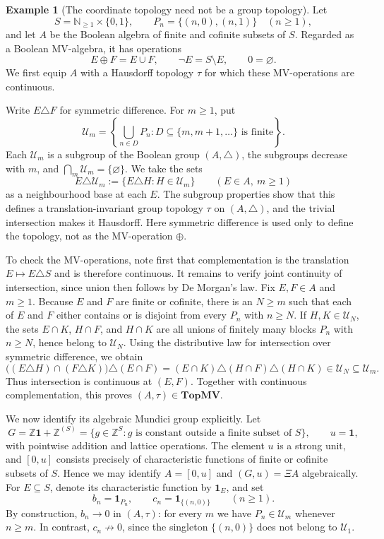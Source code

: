 \documentclass[preprint,3p]{elsarticle}
\theoremstyle{plain}
\theoremstyle{definition}
\newtheorem{exmp}[thm]{Example}
\newcommand{\TopMV}{\mathbf{TopMV}}
\numberwithin{equation}{section}
\begin{document}
\begin{exmp}[The coordinate topology need not be a group topology]
\label{exmp-kappa-not-group}
Let
\[
 S=\mathbb N_{\geq1}\times\{0,1\},
 \qquad P_n=\{(n,0),(n,1)\}\quad(n\geq1),
\]
and let $A$ be the Boolean algebra of finite and cofinite subsets of
$S$.  Regarded as a Boolean MV-algebra, it has operations
\[
 E\oplus F=E\cup F,\qquad
 \neg E=S\setminus E,\qquad 0=\varnothing.
\]
We first equip $A$ with a Hausdorff topology $\tau$ for which these
MV-operations are continuous.

Write $E\triangle F$ for symmetric difference.  For $m\geq1$, put
\[
 \mathcal U_m=
 \left\{\bigcup_{n\in D}P_n:
 D\subseteq\{m,m+1,\ldots\}\text{ is finite}\right\}.
\]
Each $\mathcal U_m$ is a subgroup of the Boolean group
$(A,\triangle)$, the subgroups decrease with $m$, and
$\bigcap_m\mathcal U_m=\{\varnothing\}$.  We take the sets
\[
 E\triangle\mathcal U_m
 :=\{E\triangle H:H\in\mathcal U_m\}
 \qquad(E\in A,\ m\geq1)
\]
as a neighbourhood base at each $E$.  The subgroup properties show
that this defines a translation-invariant group topology $\tau$ on
$(A,\triangle)$, and the trivial intersection makes it Hausdorff.
Here symmetric difference is used only to define the topology, not
as the MV-operation $\oplus$.

To check the MV-operations, note first that complementation is the
translation $E\mapsto E\triangle S$ and is therefore continuous.
It remains to verify joint continuity of intersection, since union
then follows by De Morgan's law.  Fix $E,F\in A$ and $m\geq1$.
Because $E$ and $F$ are finite or cofinite, there is an $N\geq m$
such that each of $E$ and $F$ either contains or is disjoint from
every $P_n$ with $n\geq N$.  If $H,K\in\mathcal U_N$, the sets
$E\cap K$, $H\cap F$, and $H\cap K$ are all unions of finitely many
blocks $P_n$ with $n\geq N$, hence belong to $\mathcal U_N$.
Using the distributive law for intersection over symmetric
difference, we obtain
\[
 \bigl((E\triangle H)\cap(F\triangle K)\bigr)
       \triangle(E\cap F)
 =
 (E\cap K)\triangle(H\cap F)\triangle(H\cap K)
 \in\mathcal U_N\subseteq\mathcal U_m.
\]
Thus intersection is continuous at $(E,F)$.  Together with
continuous complementation, this proves
$(A,\tau)\in\TopMV$.

We now identify its algebraic Mundici group explicitly.
Let
\[
 G=\mathbb Z\mathbf1+\mathbb Z^{(S)}
   =\{g\in\mathbb Z^S:
       g\text{ is constant outside a finite subset of }S\},
 \qquad u=\mathbf1,
\]
with pointwise addition and lattice operations.
The element $u$ is a strong unit, and $[0,u]$ consists precisely
of characteristic functions of finite or cofinite subsets of $S$.
Hence we may identify $A=[0,u]$ and $(G,u)=\Xi A$ algebraically.
For $E\subseteq S$, denote its characteristic function by
$\mathbf1_E$, and set
\[
 b_n=\mathbf1_{P_n},
 \qquad c_n=\mathbf1_{\{(n,0)\}}\qquad(n\geq1).
\]
By construction, $b_n\to0$ in $(A,\tau)$: for every $m$ we have
$P_n\in\mathcal U_m$ whenever $n\geq m$.
In contrast, $c_n\not\to0$, since the singleton $\{(n,0)\}$
does not belong to $\mathcal U_1$.


\end{exmp}
\end{document}
